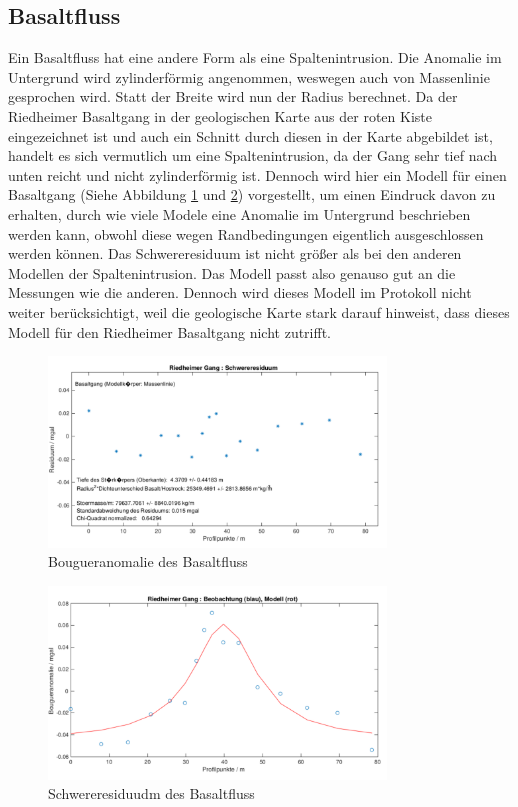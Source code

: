 \subsection{Basaltfluss}

Ein Basaltfluss hat eine andere Form als eine Spaltenintrusion. Die Anomalie im Untergrund wird zylinderförmig angenommen, weswegen auch von Massenlinie gesprochen wird. Statt der Breite wird nun der Radius berechnet. Da der Riedheimer Basaltgang in der geologischen Karte aus der roten Kiste eingezeichnet ist und auch ein Schnitt durch diesen in der Karte abgebildet ist, handelt es sich vermutlich um eine Spaltenintrusion, da der Gang sehr tief nach unten  reicht und nicht zylinderförmig ist. Dennoch wird hier ein Modell für einen Basaltgang (Siehe Abbildung \ref{fig:modell3} und \ref{fig:modell3_res}) vorgestellt, um einen Eindruck davon zu erhalten, durch wie viele Modele eine Anomalie im Untergrund beschrieben werden kann, obwohl diese wegen Randbedingungen eigentlich ausgeschlossen werden können. Das Schwereresiduum ist nicht größer als bei den anderen Modellen der Spaltenintrusion. Das Modell passt also genauso gut an die Messungen wie die anderen. Dennoch wird dieses Modell im Protokoll nicht weiter berücksichtigt, weil die geologische Karte stark darauf hinweist, dass dieses Modell für den Riedheimer Basaltgang nicht zutrifft.

\begin{figure}[!ht]
 \centering
 \includegraphics[width=0.8\textwidth]{fig/modell3}
 \caption{Bougueranomalie des Basaltfluss}
 \label{fig:modell3}
\end{figure}

\begin{figure}[!ht]
 \centering
 \includegraphics[width=0.8\textwidth]{fig/modell3_res}
 \caption{Schwereresiduudm des Basaltfluss}
 \label{fig:modell3_res}
\end{figure}

